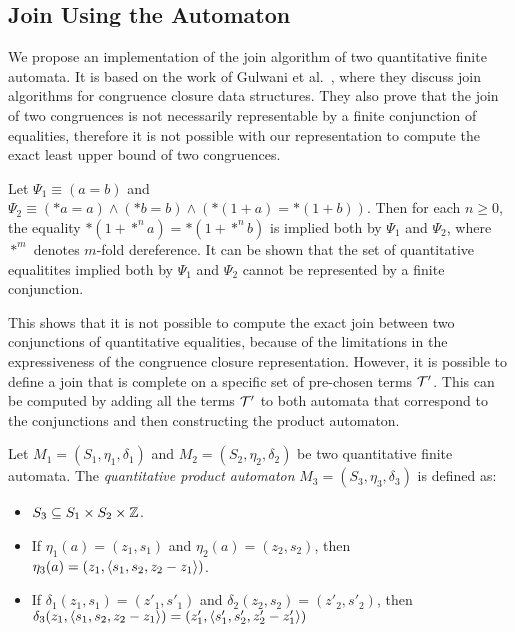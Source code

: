 \subsection{Join Using the Automaton}

We propose an implementation of the join algorithm of two quantitative finite automata.
It is based on the work of Gulwani et al.~\cite{join}, where they discuss join algorithms for congruence closure data structures.
They also prove that the join of two congruences is not necessarily representable by a finite conjunction of equalities, therefore it is not possible with our representation to compute the exact least upper bound of two congruences.

\begin{example}\label{example:infinite-join}
    Let $\Psi_1 \equiv (a = b)$ and $\Psi_2 \equiv (*a = a)\land (*b=b) \land (*(1 + a) = *(1 + b))$. Then for each $n \geq 0$, the equality $*(1+*^n a) = *(1 + *^n b)$ is implied both by $\Psi_1$ and $\Psi_2$, where $*^m$ denotes $m$-fold dereference.
    It can be shown that the set of quantitative equalitites implied both by $\Psi_1$ and $\Psi_2$ cannot be represented by a finite conjunction\cite{join, 2pointer}.
\end{example}

This shows that it is not possible to compute the exact join between two conjunctions of quantitative equalities, because of the limitations in the expressiveness of the congruence closure representation.
However, it is possible to define a join that is complete on  a specific set of pre-chosen terms $\mathcal{T}'$.
This can be computed by adding all the terms $\mathcal{T}'$ to both automata that correspond to the conjunctions and then constructing the product automaton.

\begin{definition}
    Let $M_1 = (S_1,\eta_1,\delta_1)$ and $M_2 = (S_2, \eta_2,\delta_2)$ be two quantitative finite automata. The \emph{quantitative product automaton} $M_3 = (S_3, \eta_3, \delta_3)$ is defined as:
    \begin{itemize}
        \item $S_3 \subseteq S_1 \times S_2 \times \mathbb{Z}$.
        \item If $\eta_1(a) = (z_1, s_1)$ and $\eta_2(a) = (z_2, s_2)$, then
              $\eta_3(a) = (z_1, \langle s_1, s_2, z_2-z_1\rangle)$.
        \item If $\delta_1(z_1, s_1) = (z'_1, s'_1)$ and $\delta_2(z_2, s_2) = (z'_2, s'_2)$, then $\delta_3(z_1, \langle s_1, s_2, z_2 - z_1\rangle) =  (z'_1, \langle s'_1, s'_2, z'_2 -z'_1\rangle)$
    \end{itemize}
\end{definition}

